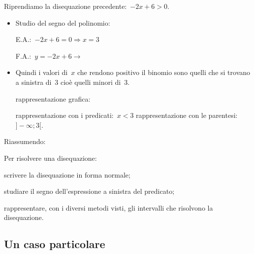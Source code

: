  \begin{esempio}
Riprendiamo la disequazione precedente:~$-2 x +6 > 0$.
\begin{itemize} [noitemsep]
 \item Studio del segno del polinomio: \\
 \begin{minipage}{.45\textwidth}
  E.A.:~$-2 x +6=0 \Rightarrow  x=3$
 \end{minipage}
 \begin{minipage}{.25\textwidth}
  F.A.:~$y=-2 x +6 \rightarrow $
 \end{minipage}
 \begin{minipage}{.3\textwidth}
  
 \end{minipage}
 \item Quindi i valori di~$x$ che rendono positivo il binomio sono quelli che 
si trovano a sinistra di~3 cioè quelli minori di~3. 
 \subitem 
  \begin{minipage}{.35\textwidth}
   rappresentazione grafica: 
  \end{minipage}
  \begin{minipage}{.30\textwidth}
   
  \end{minipage}
 \subitem rappresentazione con i predicati:~$x < 3$ 
 \subitem rappresentazione con le parentesi:~$]-∞; 3[$. 
\end{itemize}
 \end{esempio}

Riassumendo:

\begin{procedura}
 Per risolvere una disequazione:
\begin{enumeratea}
 \item scrivere la disequazione in forma normale;
 \item studiare il segno dell'espressione a sinistra del predicato;
 \item rappresentare, con i diversi metodi visti, 
  gli intervalli che risolvono la disequazione.
\end{enumeratea}
\end{procedura}

\subsection{Un caso particolare}

